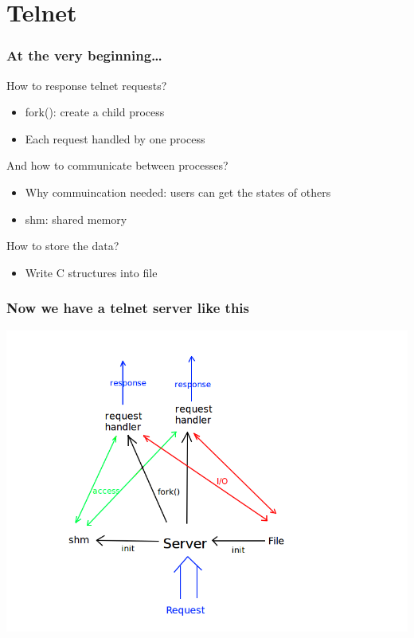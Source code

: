 \documentclass[slidestop,compress,mathserif]{beamer}
\begin{document}
  \section{Telnet}
  \begin{frame}
    \frametitle{At the very beginning\dots}
    \pause
    \begin{block}{How to response telnet requests?}
      \begin{itemize}
        \item fork(): create a child process
        \item Each request handled by one process
      \end{itemize}
    \end{block}
    \pause
    \begin{block}{And how to communicate between processes?}
      \begin{itemize}
        \item Why commuincation needed: users can get the states of others
        \item shm: shared memory
      \end{itemize}
    \end{block}
    \pause
    \begin{block}{How to store the data?}
      \begin{itemize}
        \item Write C structures into file
      \end{itemize}
    \end{block}
  \end{frame}
  \begin{frame}
    \frametitle{Now we have a telnet server like this}
    \includegraphics[scale=0.35]{telnet.png}
  \end{frame}
\end{document}
